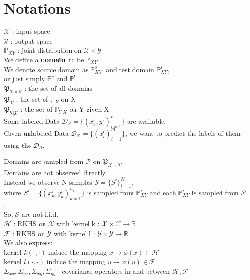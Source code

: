 \documentclass{article}
\begin{document}
\section{Notations}
$\mathcal{X} $ : input space\\
$\mathcal{Y}$ : output space\\
$\mathbb{P} _{XY}$ : joint distribution on $\mathcal{X} \times \mathcal{Y}$\\ 
We define a $\bold{domain}$ to be $\mathbb{P} _{XY}$\\
We denote source domain as $\mathbb{P} ^s _{XY}$, and test domain $\mathbb{P} ^t _{XY}$,\\
or just simply $\mathbb{P} ^s$ and $\mathbb{P} ^t $.\\
$\mathfrak{P} _{\mathcal{X} \times \mathcal{Y}}$ : the set of all domains\\
$\mathfrak{P} _\mathcal{X}$ : the set of $\mathbb{P} _X$ on X\\
$\mathfrak{P} _{\mathcal{Y}|\mathcal{X}}$ : the set of $\mathbb{P} _{Y|X}$ on Y given X
\\
Some labeled Data $\mathcal{D_S}= \{(x^s _i, y^s _i)_{i=1} ^{n}\}$ are available.\\
Given unlabeled Data $\mathcal{D_T}= \{(x^t _i)_{i=1} ^{m}\}$, we want to predict the labels of them using the  $\mathcal{D_S}$.


Domains are sampled from $\mathcal{P}$ on $\mathfrak{P} _{\mathcal{X} \times \mathcal{Y}}$.\\
Domains are not observed directly.\\
Instead we observe N samples $\mathcal{S} = \{S^i\}_{i=1} ^N$,\\
where $S^i = \{(x _k ^i ,y _k ^i )_{k=1} ^{n _i}\}$ is sampled from $\mathbb{P} _{XY} ^i$ and each $\mathbb{P} _{XY} ^i$ is sampled from $\mathcal{P}$.\\
So, $\mathcal{S}$ are not i.i.d.\\
$\mathcal{H}$ : RKHS on $\mathcal{X} $ with kernel k : $\mathcal{X} \times \mathcal{X} \to \mathbb{R}$\\
$\mathcal{F}$ : RKHS on $\mathcal{Y} $ with kernel l : $\mathcal{Y} \times \mathcal{Y} \to \mathbb{R}$\\
We also express:\\
kernel $k(\cdot , \cdot)$ induce the mapping $x \to \phi(x) \in \mathcal{H}$\\
kernel $l(\cdot , \cdot)$ induce the mapping $y \to \varphi(y) \in \mathcal{F}$\\
$\Sigma _{xx} , \Sigma _{yx} , \Sigma _{xy} , \Sigma _{yy}$ : covariance operators in and between $\mathcal{H} , \mathcal{F}$
\end{document}
